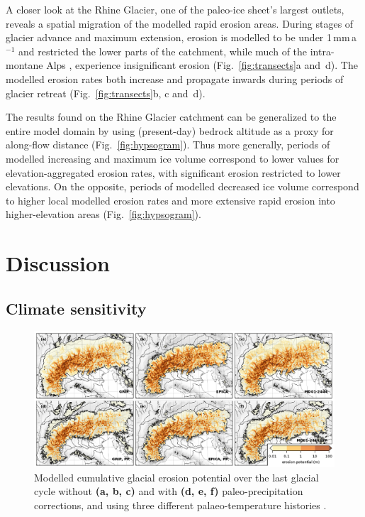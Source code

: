 \documentclass[esurf, manuscript]{copernicus}
\begin{document}
    A closer look at the Rhine Glacier, one of the paleo-ice sheet's largest
    outlets, reveals a spatial migration of the modelled rapid erosion areas.
    During stages of glacier advance and maximum extension, erosion is modelled
    to be under 1\,mm\,a$^{-1}$ and restricted the lower parts of the
    catchment, while much of the intra-montane Alps \citep[modelled to be
    largely cold-based, Fig.~6c in][]{Seguinot.etal.2018}, experience
    insignificant erosion (Fig.~\ref{fig:transects}a and~d). The modelled
    erosion rates both increase and propagate inwards during periods of glacier
    retreat (Fig.~\ref{fig:transects}b, c and~d).

    The results found on the Rhine Glacier catchment can be generalized to the
    entire model domain by using (present-day) bedrock altitude as a proxy for
    along-flow distance (Fig.~\ref{fig:hypsogram}). Thus more generally,
    periods of modelled increasing and maximum ice volume correspond to lower
    values for elevation-aggregated erosion rates, with significant erosion
    restricted to lower elevations. On the opposite, periods of modelled
    decreased ice volume correspond to higher local modelled erosion rates and
    more extensive rapid erosion into higher-elevation areas
    (Fig.~\ref{fig:hypsogram}).


\section{Discussion}

\subsection{Climate sensitivity}
\label{sec:sensitivity}

    \begin{figure}
      \centerline{\includegraphics{alpero_sensitivity}}
      \caption{%
        Modelled cumulative glacial erosion potential over the last glacial
        cycle without \textbf{(a, b, c)} and with \textbf{(d, e, f)}
        paleo-precipitation corrections, and using three different
        palaeo-temperature histories \citep[see][]{Seguinot.etal.2018}.}
      \label{fig:sensitivity}
    \end{figure}
\end{document}
